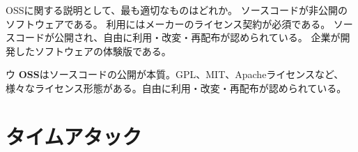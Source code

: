 \begin{itpmon}{%
OSSに関する説明として、最も適切なものはどれか。}
\sentakushi
  {ソースコードが非公開のソフトウェアである。}
  {利用にはメーカーのライセンス契約が必須である。}
  {ソースコードが公開され、自由に利用・改変・再配布が認められている。}
  {企業が開発したソフトウェアの体験版である。}
\end{itpmon}
\begin{kaisetsu}{ウ}
\textbf{OSS}はソースコードの公開が本質。GPL、MIT、Apacheライセンスなど、様々なライセンス形態がある。自由に利用・改変・再配布が認められている。
\end{kaisetsu}

\section{タイムアタック}

